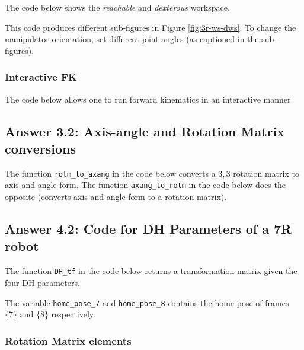 The code below shows the \emph{reachable} and \emph{dexterous} workspace.



This code produces different sub-figures in Figure \ref{fig:3r-ws-dws}. To change the manipulator orientation, set different joint angles (as captioned in the sub-figures).

\subsubsection{Interactive FK}
\label{app:a2.2-3r-fk-interactive}

The code below allows one to run forward kinematics in an interactive manner




\subsection[A3.2: Code]{Answer 3.2: Axis-angle and Rotation Matrix conversions}
\label{app:a3.2-axang-rotm-conv-code}

The function \texttt{rotm\_to\_axang} in the code below converts a $3, 3$ rotation matrix to axis and angle form. The function \texttt{axang\_to\_rotm} in the code below does the opposite (converts axis and angle form to a rotation matrix).



\subsection[A4.2: Code]{Answer 4.2: Code for DH Parameters of a 7R robot}
\label{app:a4.2-dh-params-7r-code}

The function \texttt{DH\_tf} in the code below returns a transformation matrix given the four DH parameters.



The variable \texttt{home\_pose\_7} and \texttt{home\_pose\_8} contains the home pose of frames $\{7\}$ and $\{8\}$ respectively.

\subsubsection*{Rotation Matrix elements}

